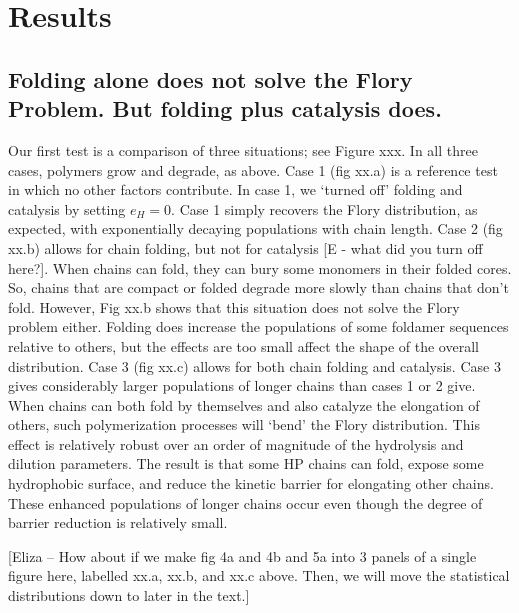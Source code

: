 \documentclass[5p,times]{elsarticle}
\begin{document}
\section{Results}

\subsection{Folding alone does not solve the Flory Problem.  But folding plus catalysis does.}

 Our first test is a comparison of three situations; see Figure xxx.  In all three cases, polymers 
grow and degrade, as above.  Case 1 (fig xx.a) is a reference test in which no other factors 
contribute.  In case 1, we `turned off' folding and catalysis by setting $e_H = 0$.  Case 1 simply 
recovers the Flory distribution, as expected, with exponentially decaying populations with chain 
length.  Case 2 (fig xx.b) allows for chain folding, but not for catalysis [E - what did you turn 
off here?].  When chains can fold, they can bury some monomers in their folded cores.  So, chains 
that are compact or folded degrade more slowly than chains that don't fold.  However, Fig xx.b 
shows that this situation does not solve the Flory problem either.  Folding does increase the 
populations of some foldamer sequences relative to others, but the effects are too small affect the 
shape of the overall distribution.  Case 3 (fig xx.c) allows for both chain folding and catalysis.  
Case 3 gives considerably larger populations of longer chains than cases 1 or 2 give.  When chains 
can both fold by themselves and also catalyze the elongation of others, such polymerization 
processes will `bend' the Flory distribution.  This effect is relatively robust over an order of 
magnitude of the hydrolysis and dilution parameters.  The result is that some HP chains can fold, 
expose some hydrophobic surface, and reduce the kinetic barrier for elongating other chains.  These 
enhanced populations of longer chains occur even though the degree of barrier reduction is 
relatively small.
 
 [Eliza -- How about if we make fig 4a and 4b and 5a into 3 panels of a single figure here, 
labelled xx.a, xx.b, and xx.c above.  Then, we will move the statistical distributions down to 
later 
in the text.]
 
\end{document}
